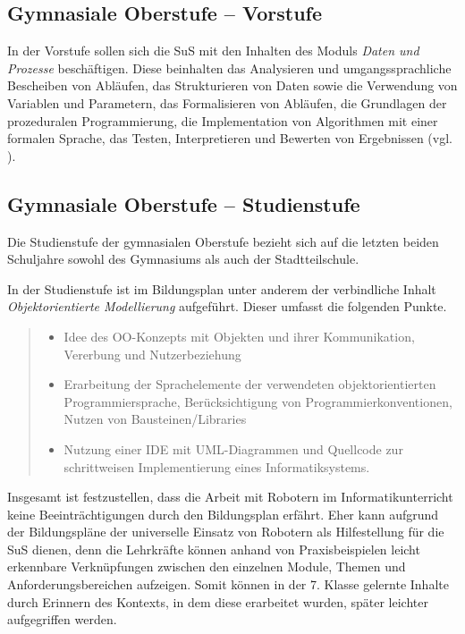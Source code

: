 \documentclass[paper=a4, DIV=calc, BCOR=12mm, twoside=on, onecolumn=on, open = right, titlepage =on, parskip =half-, headsepline = on, footsepline = off, chapterprefix = off, appendixprefix = on, fontsize = 12pt, numbers = noenddot, abstract = on]{scrbook}
\begin{document}
\vspace*{-1ex}
\subsection{Gymnasiale Oberstufe -- Vorstufe}

In der Vorstufe sollen sich die SuS mit den Inhalten des Moduls \emph{Daten und Prozesse} beschäftigen. Diese beinhalten das Analysieren und umgangssprachliche Bescheiben von Abläufen, das Strukturieren von Daten sowie die Verwendung von Variablen und Parametern, das Formalisieren von Abläufen, die Grundlagen der prozeduralen Programmierung, die Implementation von Algorithmen mit einer formalen Sprache, das Testen, Interpretieren und Bewerten von Ergebnissen (vgl. \cite{oberstufe:09}). 
\vspace*{-1ex}
\subsection{Gymnasiale Oberstufe -- Studienstufe}
Die Studienstufe der gymnasialen Oberstufe bezieht sich auf die letzten beiden Schuljahre sowohl des Gymnasiums als auch der Stadtteilschule.

In der Studienstufe ist im Bildungsplan unter anderem der verbindliche Inhalt \emph{Objektorientierte Modellierung} aufgeführt. Dieser umfasst die folgenden Punkte.
\begin{quote}
\begin{itemize}
\item Idee des OO-Konzepts mit Objekten und ihrer Kommunikation, Vererbung und Nutzerbeziehung
\item Erarbeitung der Sprachelemente der verwendeten objektorientierten Programmiersprache, Berücksichtigung von Programmierkonventionen, Nutzen von Bausteinen/Libraries
\item Nutzung einer IDE mit UML-Diagrammen und Quellcode zur schrittweisen Implementierung eines Informatiksystems. \hfill \cite{oberstufe:09}
\end{itemize}
\end{quote}


Insgesamt ist festzustellen, dass die Arbeit mit Robotern im Informatikunterricht keine Beeinträchtigungen durch den Bildungsplan erfährt. Eher kann aufgrund der Bildungspläne der universelle Einsatz von Robotern als Hilfestellung für die SuS dienen, denn die Lehrkräfte können anhand von Praxisbeispielen leicht erkennbare Verknüpfungen zwischen den einzelnen Module, Themen und Anforderungsbereichen aufzeigen. Somit können in der 7. Klasse gelernte Inhalte durch Erinnern des Kontexts, in dem diese erarbeitet wurden, später leichter aufgegriffen werden.
\end{document}
